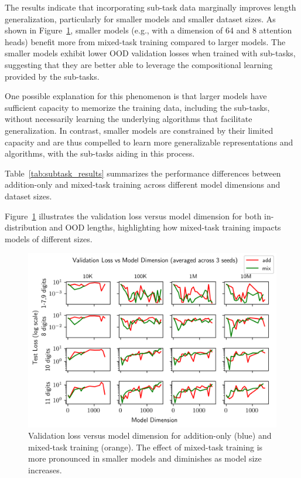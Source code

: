 The results indicate that incorporating sub-task data marginally improves length generalization, particularly for smaller models and smaller dataset sizes. As shown in Figure~\ref{fig:exp_27_val_loss_vs_n_embd}, smaller models (e.g., with a dimension of 64 and 8 attention heads) benefit more from mixed-task training compared to larger models. The smaller models exhibit lower OOD validation losses when trained with sub-tasks, suggesting that they are better able to leverage the compositional learning provided by the sub-tasks.

One possible explanation for this phenomenon is that larger models have sufficient capacity to memorize the training data, including the sub-tasks, without necessarily learning the underlying algorithms that facilitate generalization. In contrast, smaller models are constrained by their limited capacity and are thus compelled to learn more generalizable representations and algorithms, with the sub-tasks aiding in this process.

Table~\ref{tab:subtask_results} summarizes the performance differences between addition-only and mixed-task training across different model dimensions and dataset sizes.

Figure~\ref{fig:exp_27_val_loss_vs_n_embd} illustrates the validation loss versus model dimension for both in-distribution and OOD lengths, highlighting how mixed-task training impacts models of different sizes.

\begin{figure}[h!]
    \centering
    \includegraphics[width=\textwidth]{fig/exp_27_val_loss_vs_n_embd.png}
    \caption{Validation loss versus model dimension for addition-only (blue) and mixed-task training (orange). The effect of mixed-task training is more pronounced in smaller models and diminishes as model size increases.}
    \label{fig:exp_27_val_loss_vs_n_embd}
\end{figure}

